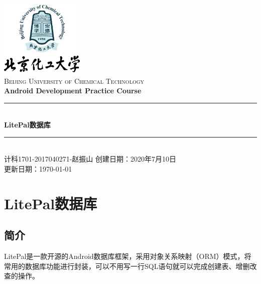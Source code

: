 \documentclass[cs4size,a4paper]{ctexart}
\numberwithin{equation}{section}
\numberwithin{table}{section}
\numberwithin{figure}{section}
\newcommand{\HRule}{\rule{\linewidth}{0.5mm}}
\begin{document}
\newtheorem{example}{例}              	%
\newtheorem{algorithem}{算法}	
\newtheorem{theorem}{定理}            	%
\newtheorem{definition}{定义}
\newtheorem{axiom}{公理}
\newtheorem{property}{性质}
\newtheorem{proposition}{命题}
\newtheorem{lemma}{引理}
\newtheorem{corollary}{推论}
\newtheorem{remark}{注解}
\newtheorem{condition}{条件}
\newtheorem{conclusion}{结论}
\newtheorem{assumption}{假设}
\renewcommand{\contentsname}{目录}     
\renewcommand{\abstractname}{摘要} 
\renewcommand{\refname}{参考文献}     
\renewcommand{\indexname}{索引}
\renewcommand{\figurename}{图}
\renewcommand{\tablename}{表}
\renewcommand{\appendixname}{附录}
\renewcommand{\proofname}{证明}
\renewcommand\emph[1]{\textcolor{black}{\textbf{#1}}}
\begin{titlepage}
\begin{center}
\includegraphics[width=0.30\textwidth]{logo}\\[1cm]    
\textsc{\Large Beijing University of Chemical Technology}\\[1.0cm]
\textsf{\Large\bfseries Android Development Practice Course}\\[0.5cm]
\HRule \\[0.8cm]
{\huge \bfseries LitePal数据库}\\[0.4cm]
\HRule \\[0.7cm]
\textsc{计科1701-2017040271-赵振山}
\tableofcontents 
\vfill
{创建日期：2020年7月10日}\\
{更新日期：\today}
\end{center}
\end{titlepage}
\pagestyle{plain}
\thispagestyle{empty}
\pagestyle{fancy}

\section{LitePal数据库}
\subsection{简介}
LitePal是一款开源的Android数据库框架，采用对象关系映射（ORM）模式，将常用的数据库功能进行封装，可以不用写一行SQL语句就可以完成创建表、增删改查的操作。
\end{document}
